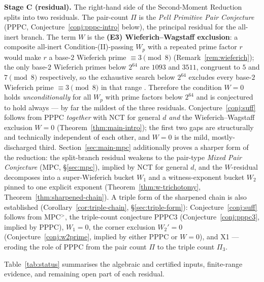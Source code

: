 \documentclass[11pt]{amsart}
\theoremstyle{plain}
\theoremstyle{definition}
\theoremstyle{remark}
\numberwithin{equation}{section}
\begin{document}
\textbf{Stage C (residual).} The right-hand side of the Second-Moment Reduction splits into two residuals. The pair-count $\Pi$ is the \emph{Pell Primitive Pair Conjecture} (PPPC, Conjecture~\ref{conj:pppc-intro} below), the principal residual for the all-inert branch. The term $W$ is the \textbf{(E3) Wieferich--Wagstaff exclusion}: a composite all-inert Condition-(II)-passing $W_p$ with a repeated prime factor $r$ would make $r$ a base-$2$ Wieferich prime $\equiv 3 \pmod 8$ (Remark~\ref{rem:wieferich}); the only base-$2$ Wieferich primes below $2^{64}$ are $1093$ and $3511$, congruent to $5$ and $7 \pmod 8$ respectively, so the exhaustive search below $2^{64}$ excludes every base-$2$ Wieferich prime $\equiv 3 \pmod 8$ in that range \cite{ref:OEISWieferich}. Therefore the condition $W = 0$ holds \emph{unconditionally} for all $W_p$ with prime factors below $2^{64}$ and is conjectured to hold always --- by far the mildest of the three residuals. Conjecture~\ref{conj:suff} follows from PPPC \emph{together} with NCT for general $d$ \emph{and} the Wieferich--Wagstaff exclusion $W = 0$ (Theorem~\ref{thm:main-intro}); the first two gaps are structurally and technically independent of each other, and $W = 0$ is the mild, mostly-discharged third. Section~\ref{sec:main-mpc} additionally proves a sharper form of the reduction: the split-branch residual weakens to the pair-type \emph{Mixed Pair Conjecture} (MPC, \S\ref{sec:mpc}), implied by NCT for general $d$, and the $W$-residual decomposes into a super-Wieferich bucket $W_1$ and a witness-exponent bucket $W_2$ pinned to one explicit exponent (Theorem~\ref{thm:w-trichotomy}, Theorem~\ref{thm:sharpened-chain}). A triple form of the sharpened chain is also established (Corollary~\ref{cor:triple-chain}, \S\ref{sec:triple-form}): Conjecture~\ref{conj:suff} follows from MPC$^{>}$, the triple-count conjecture PPPC3 (Conjecture~\ref{conj:pppc3}, implied by PPPC), $W_1 = 0$, the corner exclusion $W_2' = 0$ (Conjecture~\ref{conj:w2prime}, implied by either PPPC or $W = 0$), and X1 --- eroding the role of PPPC from the pair count $\Pi$ to the triple count $\Pi_3$.

Table~\ref{tab:status} summarises the algebraic and certified inputs, finite-range evidence, and remaining open part of each residual.
\end{document}
